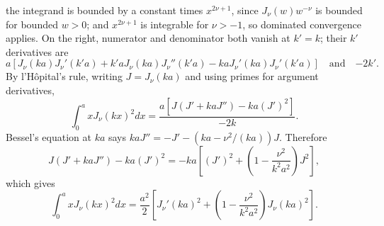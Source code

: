 the integrand is bounded by a constant times $x^{2\nu+1}$, since
$J_\nu(w)w^{-\nu}$ is bounded for bounded $w>0$; and $x^{2\nu+1}$ is integrable for
$\nu>-1$, so dominated convergence applies. On the right, numerator
and denominator both vanish at $k'=k$; their $k'$ derivatives are
\[
a[J_\nu(ka)J_\nu'(k'a)+k'aJ_\nu(ka)J_\nu''(k'a)
-kaJ_\nu'(ka)J_\nu'(k'a)]
\quad\text{and}\quad {-2k'}.
\]
By l'H\^opital's rule, writing $J=J_\nu(ka)$ and using primes for
argument derivatives,
\[
\int_0^a xJ_\nu(kx)^2dx
=\frac{a[J(J'+kaJ'')-ka(J')^2]}{-2k}.
\]
Bessel's equation at $ka$ says
$kaJ''=-J'-(ka-\nu^2/(ka))J$. Therefore
\[
J(J'+kaJ'')-ka(J')^2
=-ka\left[(J')^2+\left(1-\frac{\nu^2}{k^2a^2}\right)J^2\right],
\]
which gives
\[
\boxed{\int_0^a xJ_\nu(kx)^2dx
=\frac{a^2}{2}\left[J_\nu'(ka)^2+
\left(1-\frac{\nu^2}{k^2a^2}\right)J_\nu(ka)^2\right]}.
\]

